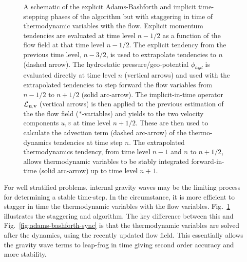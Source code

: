 \begin{figure}
\begin{center}
\end{center}
\caption{
A schematic of the explicit Adams-Bashforth and implicit time-stepping
phases of the algorithm but with staggering in time of thermodynamic
variables with the flow. 
Explicit momentum tendencies are evaluated at time level $n-1/2$ as a 
function of the flow field at that time level $n-1/2$.
The explicit tendency from the previous time level, $n-3/2$, is used to
extrapolate tendencies to $n$ (dashed arrow). 
The hydrostatic pressure/geo-potential $\phi_{hyd}$ is evaluated directly 
at time level $n$ (vertical arrows) and used with the extrapolated tendencies
to step forward the flow variables from $n-1/2$ to $n+1/2$ (solid arc-arrow).
The implicit-in-time operator ${\cal L}_{\bf u,v}$ (vertical arrows) is 
then applied to the previous estimation of the the flow field ($*$-variables) 
and yields to the two velocity components $u,v$ at time level $n+1/2$. 
These are then used to calculate the advection term (dashed arc-arrow) 
of the thermo-dynamics tendencies at time step $n$.
The extrapolated thermodynamics tendency, from time level $n-1$ and $n$ 
to $n+1/2$, allows thermodynamic variables to be stably integrated 
forward-in-time (solid arc-arrow) up to time level $n+1$.
}
\label{fig:adams-bashforth-staggered}
\end{figure}

For well stratified problems, internal gravity waves may be the
limiting process for determining a stable time-step. In the
circumstance, it is more efficient to stagger in time the
thermodynamic variables with the flow
variables. Fig.~\ref{fig:adams-bashforth-staggered} illustrates the
staggering and algorithm. The key difference between this and
Fig.~\ref{fig:adams-bashforth-sync} is that the thermodynamic variables 
are solved after the dynamics, using the recently updated flow field.
This essentially allows the gravity wave terms to leap-frog in
time giving second order accuracy and more stability.

